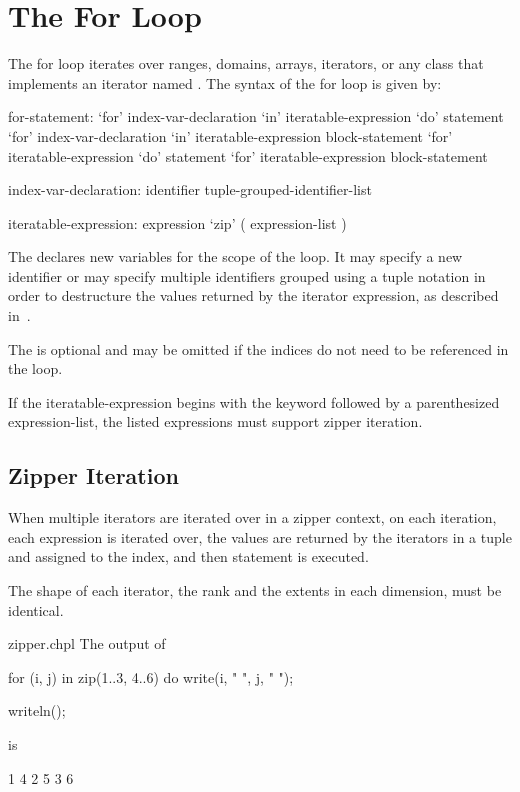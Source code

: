 \section{The For Loop}
\label{The_For_Loop}

The for loop iterates over ranges, domains, arrays, iterators, or any
class that implements an iterator named .  The syntax of
the for loop is given by:
\begin{syntax}
for-statement:
  `for' index-var-declaration `in' iteratable-expression `do' statement
  `for' index-var-declaration `in' iteratable-expression block-statement
  `for' iteratable-expression `do' statement
  `for' iteratable-expression block-statement

index-var-declaration:
  identifier
  tuple-grouped-identifier-list

iteratable-expression:
  expression
  `zip' ( expression-list )
\end{syntax}

The  declares new variables for the scope
of the loop.  It may specify a new identifier or may specify multiple
identifiers grouped using a tuple notation in order to destructure the
values returned by the iterator expression, as described
in~.

The  is optional and may be omitted if the
indices do not need to be referenced in the loop.

If the iteratable-expression begins with the keyword  followed
by a parenthesized expression-list, the listed expressions must support 
zipper iteration.

\subsection{Zipper Iteration}
\label{Zipper_Iteration}

When multiple iterators are iterated over in a zipper context, on each
iteration, each expression is iterated over, the values are returned
by the iterators in a tuple and assigned to the index, and then
statement is executed.

The shape of each iterator, the rank and the extents in each
dimension, must be identical.

\begin{chapelexample}{zipper.chpl}
The output of
\begin{chapel}
for (i, j) in zip(1..3, 4..6) do
  write(i, " ", j, " ");
\end{chapel}
\begin{chapelpost}
writeln();
\end{chapelpost}
is
\begin{chapelprintoutput}{}
1 4 2 5 3 6
\end{chapelprintoutput}
\end{chapelexample}

